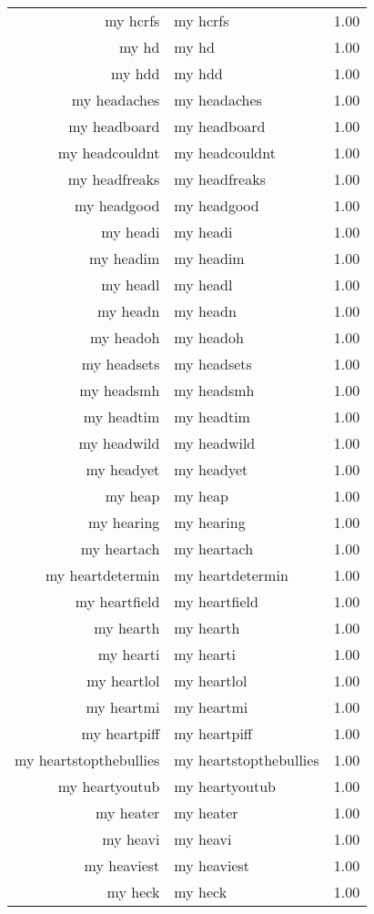 \begin{table}[ht]
\begin{tabular}{rlr}
  my hcrfs & my hcrfs & 1.00 \\ 
  my hd & my hd & 1.00 \\ 
  my hdd & my hdd & 1.00 \\ 
  my headaches & my headaches & 1.00 \\ 
  my headboard & my headboard & 1.00 \\ 
  my headcouldnt & my headcouldnt & 1.00 \\ 
  my headfreaks & my headfreaks & 1.00 \\ 
  my headgood & my headgood & 1.00 \\ 
  my headi & my headi & 1.00 \\ 
  my headim & my headim & 1.00 \\ 
  my headl & my headl & 1.00 \\ 
  my headn & my headn & 1.00 \\ 
  my headoh & my headoh & 1.00 \\ 
  my headsets & my headsets & 1.00 \\ 
  my headsmh & my headsmh & 1.00 \\ 
  my headtim & my headtim & 1.00 \\ 
  my headwild & my headwild & 1.00 \\ 
  my headyet & my headyet & 1.00 \\ 
  my heap & my heap & 1.00 \\ 
  my hearing & my hearing & 1.00 \\ 
  my heartach & my heartach & 1.00 \\ 
  my heartdetermin & my heartdetermin & 1.00 \\ 
  my heartfield & my heartfield & 1.00 \\ 
  my hearth & my hearth & 1.00 \\ 
  my hearti & my hearti & 1.00 \\ 
  my heartlol & my heartlol & 1.00 \\ 
  my heartmi & my heartmi & 1.00 \\ 
  my heartpiff & my heartpiff & 1.00 \\ 
  my heartstopthebullies & my heartstopthebullies & 1.00 \\ 
  my heartyoutub & my heartyoutub & 1.00 \\ 
  my heater & my heater & 1.00 \\ 
  my heavi & my heavi & 1.00 \\ 
  my heaviest & my heaviest & 1.00 \\ 
  my heck & my heck & 1.00 \\ 

\end{tabular}
\end{table}
